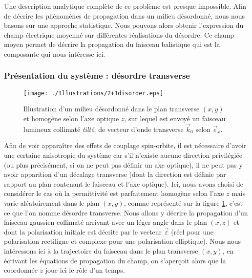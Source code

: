 \documentclass[a4paper,11pt]{article} %
\begin{document}
	Une description analytique complète de ce problème est presque impossible. Afin de décrire les phénomènes de propagation dans un milieu désordonné, nous nous basons sur une approche statistique. Nous pouvons alors obtenir l'expression du champ électrique moyenné sur différentes réalisations du désordre. Ce champ moyen permet de décrire la propagation du faisceau balistique qui est la composante qui nous intéresse ici.
	
	
	\subsubsection{Présentation du système : désordre transverse}
	
	\begin{figure}[h]
		\centering
		\begin{minipage}[c]{0.85\linewidth}
			\centering
			\texttt{[image: ./Illustrations/2+1disorder.eps]}
			\caption{Illustration d'un milieu désordonné dans le plan transverse $ (x,y) $ et homogène selon l'axe optique $ z $, sur lequel est envoyé un faisceau lumineux collimaté \textit{tilté}, de vecteur d'onde transverse $ \vec{k}_0 $ selon $ \vec{e}_x $.}
			\label{fig:systeme_desordre_transverse}
		\end{minipage}
	\end{figure}

	Afin de voir apparaître des effets de couplage spin-orbite, il est nécessaire d'avoir une certaine anisotropie du système car s'il n'existe aucune direction privilégiée (ou plus précisément, si on ne peut pas définir un axe optique), il ne peut pas y avoir apparition d'un décalage transverse (dont la direction est définie par rapport au plan contenant le faisceau et l'axe optique). Ici, nous avons choisi de considérer le cas où la permittivité est parfaitement homogène selon l'axe $ z $ mais varie aléatoirement dans le plan $ (x,y) $, comme représenté sur la figure \ref{fig:systeme_desordre_transverse}, c'est ce que l'on nomme désordre transverse. Nous allons y décrire la propagation d'un faisceau gaussien collimaté arrivant avec un léger angle dans le plan $ (x,z) $ et dont la polarisation initiale est décrite par le vecteur $ \vec{\varepsilon} $ (réel pour une polarisation rectiligne et complexe pour une polarisation elliptique). Nous nous intéressons ici à la trajectoire du faisceau dans le plan transverse $ (x,y) $, en écrivant les équations de propagation du champ, on s'aperçoit alors que la coordonnée $ z $ joue ici le rôle d'un temps.\\
	
\end{document}
